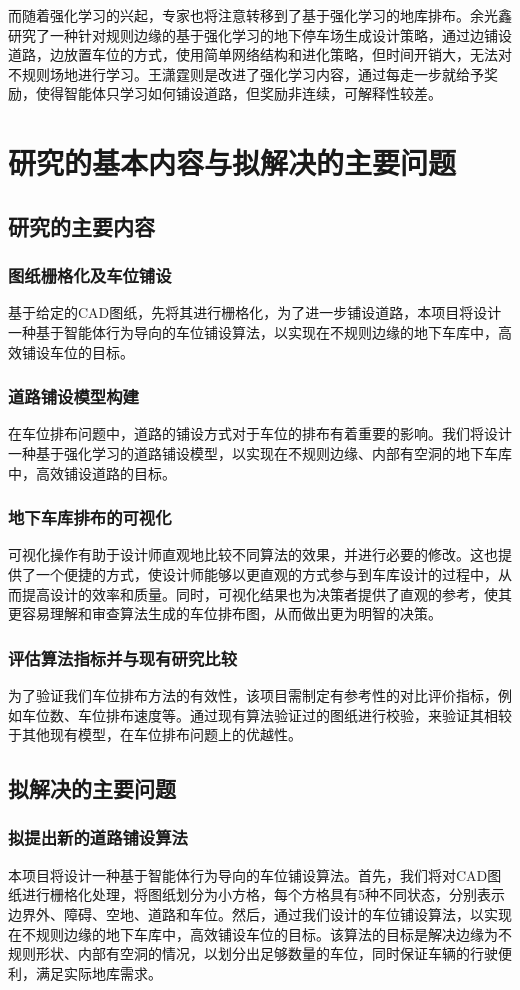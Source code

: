 而随着强化学习的兴起，专家也将注意转移到了基于强化学习的地库排布。余光鑫\cite{1020332216.nh}研究了一种针对规则边缘的基于强化学习的地下停车场生成设计策略，通过边铺设道路，边放置车位的方式，使用简单网络结构和进化策略，但时间开销大，无法对不规则场地进行学习。王潇霆\cite{1022674189.nh}则是改进了强化学习内容，通过每走一步就给予奖励，使得智能体只学习如何铺设道路，但奖励非连续，可解释性较差。

\section{研究的基本内容与拟解决的主要问题}
\subsection{研究的主要内容}
\subsubsection{图纸栅格化及车位铺设}
基于给定的CAD图纸，先将其进行栅格化，为了进一步铺设道路，本项目将设计一种基于智能体行为导向的车位铺设算法，以实现在不规则边缘的地下车库中，高效铺设车位的目标。
\subsubsection{道路铺设模型构建}
在车位排布问题中，道路的铺设方式对于车位的排布有着重要的影响。我们将设计一种基于强化学习的道路铺设模型，以实现在不规则边缘、内部有空洞的地下车库中，高效铺设道路的目标。
\subsubsection{地下车库排布的可视化}
可视化操作有助于设计师直观地比较不同算法的效果，并进行必要的修改。这也提供了一个便捷的方式，使设计师能够以更直观的方式参与到车库设计的过程中，从而提高设计的效率和质量。同时，可视化结果也为决策者提供了直观的参考，使其更容易理解和审查算法生成的车位排布图，从而做出更为明智的决策。
\subsubsection{评估算法指标并与现有研究比较}
为了验证我们车位排布方法的有效性，该项目需制定有参考性的对比评价指标，例如车位数、车位排布速度等。通过现有算法验证过的图纸进行校验，来验证其相较于其他现有模型，在车位排布问题上的优越性。
\subsection{拟解决的主要问题}
\subsubsection{拟提出新的道路铺设算法}
本项目将设计一种基于智能体行为导向的车位铺设算法。首先，我们将对CAD图纸进行栅格化处理，将图纸划分为小方格，每个方格具有5种不同状态，分别表示边界外、障碍、空地、道路和车位。然后，通过我们设计的车位铺设算法，以实现在不规则边缘的地下车库中，高效铺设车位的目标。该算法的目标是解决边缘为不规则形状、内部有空洞的情况，以划分出足够数量的车位，同时保证车辆的行驶便利，满足实际地库需求。
